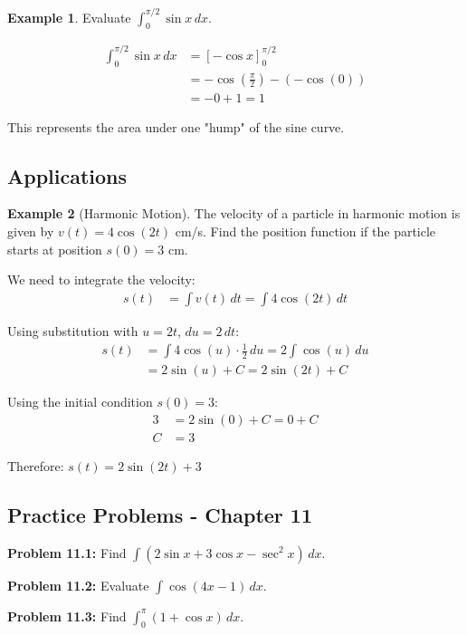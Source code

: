 \documentclass[12pt,a4paper]{book}
\theoremstyle{definition}
\newtheorem{example}{Example}[chapter]
\begin{document}
\begin{example}
Evaluate $\int_0^{\pi/2} \sin x \, dx$.

\begin{align}
\int_0^{\pi/2} \sin x \, dx &= [-\cos x]_0^{\pi/2}\\
&= -\cos\left(\frac{\pi}{2}\right) - (-\cos(0))\\
&= -0 + 1 = 1
\end{align}

This represents the area under one "hump" of the sine curve.
\end{example}

\subsection{Applications}

\begin{example}[Harmonic Motion]
The velocity of a particle in harmonic motion is given by $v(t) = 4\cos(2t)$ cm/s. Find the position function if the particle starts at position $s(0) = 3$ cm.

We need to integrate the velocity:
\begin{align}
s(t) &= \int v(t) \, dt = \int 4\cos(2t) \, dt
\end{align}

Using substitution with $u = 2t$, $du = 2 \, dt$:
\begin{align}
s(t) &= \int 4\cos(u) \cdot \frac{1}{2} \, du = 2\int \cos(u) \, du\\
&= 2\sin(u) + C = 2\sin(2t) + C
\end{align}

Using the initial condition $s(0) = 3$:
\begin{align}
3 &= 2\sin(0) + C = 0 + C\\
C &= 3
\end{align}

Therefore: $s(t) = 2\sin(2t) + 3$
\end{example}

\subsection{Practice Problems - Chapter 11}

\textbf{Problem 11.1:} Find $\int (2\sin x + 3\cos x - \sec^2 x) \, dx$.

\textbf{Problem 11.2:} Evaluate $\int \cos(4x - 1) \, dx$.

\textbf{Problem 11.3:} Find $\int_0^{\pi} (1 + \cos x) \, dx$.
\end{document}
